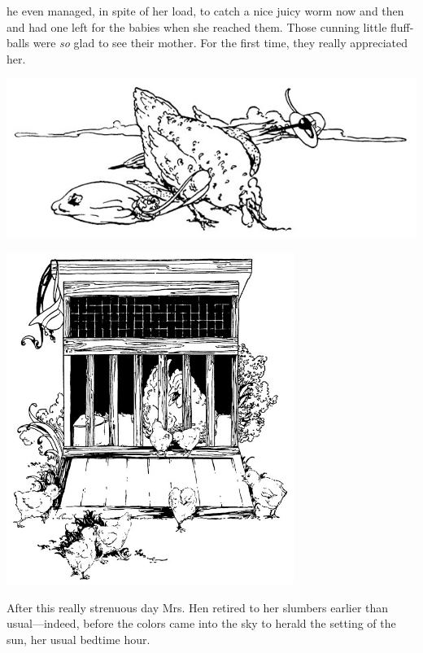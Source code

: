\documentclass[letterpaper, 10pt, openany]{memoir}
\begin{document}
he even managed, in spite of her load, to catch a nice juicy worm now and then and had one left
for the babies when she reached them. Those cunning little fluff-balls were \textit{so} glad to see
their mother. For the first time, they really appreciated her.

\vspace{\onelineskip}

\begin{center}
	\includegraphics[width=\textwidth]{image_027_3.jpg}
\end{center}

\newpage
\begin{center}
	\includegraphics[width=0.7\textwidth]{image_028.jpg}
\end{center}

After this really strenuous day Mrs. Hen retired to her slumbers earlier than usual—indeed, before
the colors came into the sky to herald the setting of the sun, her usual bedtime hour.

\vspace{\onelineskip}
\end{document}
